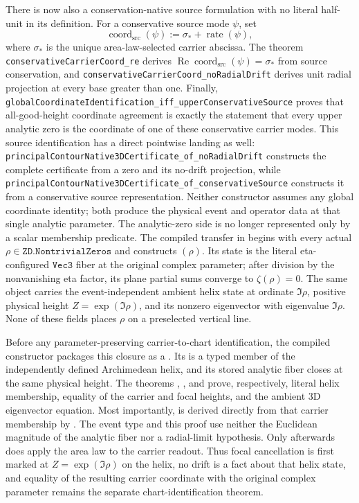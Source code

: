 \documentclass[11pt]{article}
\theoremstyle{definition}
\begin{document}
There is now also a conservation-native source formulation with no literal
half-unit in its definition.  For a conservative source mode \(\psi\), set
\[
 \operatorname{coord}_{\mathrm{src}}(\psi)
   :=\sigma_*+\operatorname{rate}(\psi),
\]
where \(\sigma_*\) is the unique area-law-selected carrier abscissa.
The theorem \texttt{conservativeCarrierCoord\_re} derives
\(\operatorname{Re}\operatorname{coord}_{\mathrm{src}}(\psi)=\sigma_*\) from
source conservation, and
\texttt{conservativeCarrierCoord\_noRadialDrift} derives unit radial projection
at every base greater than one.  Finally,
\texttt{globalCoordinateIdentification\_iff\_upperConservativeSource} proves that
all-good-height coordinate agreement is exactly the statement that every upper
analytic zero is the coordinate of one of these conservative carrier modes.
This source identification has a direct pointwise landing as well:
\texttt{principalContourNative3DCertificate\_of\_noRadialDrift} constructs the
complete certificate from a zero and its no-drift projection, while
\texttt{principalContourNative3DCertificate\_of\_conservativeSource} constructs
it from a conservative source representation.  Neither constructor assumes any
global coordinate identity; both produce the physical event and operator data at
that single analytic parameter.
The analytic-zero side is no longer represented only by a scalar membership
predicate.  The compiled transfer in
 begins with every
actual \(\rho\in\texttt{ZD.NontrivialZeros}\) and constructs
\((\rho)\).  Its state is the literal
eta-configured \(\texttt{Vec3}\) fiber at the original complex parameter; after
division by the nonvanishing eta factor, its plane partial sums converge to
\(\zeta(\rho)=0\).  The same object carries the event-independent ambient helix
state at ordinate \(\Im\rho\), positive physical height
\(Z=\exp(\Im\rho)\), and its nonzero eigenvector with eigenvalue \(\Im\rho\).
None of these fields places \(\rho\) on a preselected vertical line.

Before any parameter-preserving carrier-to-chart identification, the compiled
constructor  packages this
closure as a .  Its
 is a typed member of the independently defined
Archimedean helix, and its stored analytic fiber closes at the same physical
height.  The theorems ,
, and  prove,
respectively, literal helix membership, equality of the carrier and focal
heights, and the ambient 3D eigenvector equation.  Most importantly,
 is derived directly from that carrier membership by
.  The event type and this proof use
neither the Euclidean magnitude of the analytic fiber nor a radial-limit
hypothesis.  Only afterwards does  apply
the area law to the carrier readout.  Thus focal cancellation is first marked
at \(Z=\exp(\Im\rho)\) on the helix, no drift is a fact about that helix
state, and equality of the resulting carrier coordinate with the original
complex parameter remains the separate chart-identification theorem.
\end{document}
